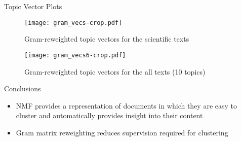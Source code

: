 \documentclass[final]{beamer}
\newlength{\sepwid}
\newlength{\onecolwid}
\newlength{\twocolwid}
\begin{document}
\begin{frame}[t]
\begin{columns}[t]
\begin{column}{\twocolwid}
\begin{columns}[t,totalwidth=\twocolwid]
\end{columns} %

\end{column} %

\begin{column}{\sepwid}\end{column} %

\begin{column}{\onecolwid} %


\begin{block}{Topic Vector Plots}

\begin{figure}
\texttt{[image: gram\_vecs-crop.pdf]}
\caption{Gram-reweighted topic vectors for the scientific texts}
\end{figure}

\begin{figure}
\texttt{[image: gram\_vecs6-crop.pdf]}
\caption{Gram-reweighted topic vectors for the all texts (10 topics)}
\end{figure}

\end{block}





\begin{block}{Conclusions}
\begin{itemize}
	\item NMF provides a representation of documents in which they are easy to cluster and automatically provides insight into their content
	\item Gram matrix reweighting reduces supervision required for clustering 
\end{itemize}
	
\end{block}







\end{column}
\end{columns}
\end{frame}
\end{document}
